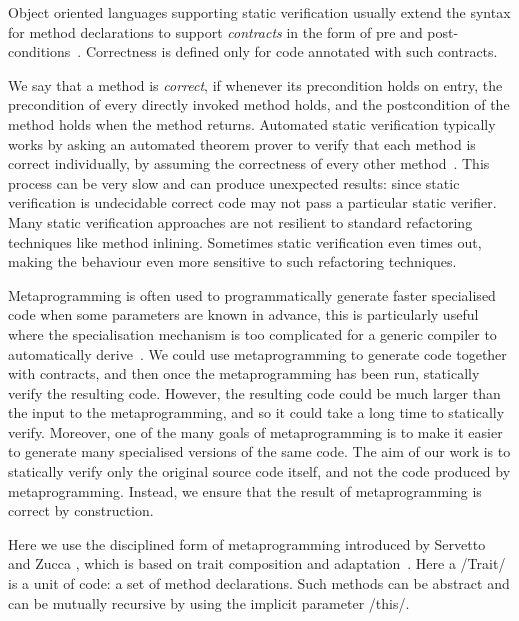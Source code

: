 \noindent Object oriented languages supporting static verification usually extend the syntax for method declarations
to support \emph{contracts} in the form of pre and post-conditions~\cite{Meyer:1988:OSC:534929}.
Correctness is defined only for code annotated with such contracts.

We say that a method is \emph{correct}, if whenever its precondition holds on entry, the precondition of every directly invoked method holds, and the postcondition of the method holds when the method returns. Automated static verification typically works by asking an automated theorem prover to verify that each method is correct individually, by assuming the correctness of every other method~\cite{barnett2004spec}. This process can be very slow and can produce unexpected results: since static verification is undecidable correct code may not pass a particular static verifier.
Many static verification approaches are not resilient to
standard refactoring techniques like 
method inlining. Sometimes static verification even times out, making the behaviour even more sensitive to such refactoring techniques.

Metaprogramming is often used to programmatically generate faster specialised code when some parameters are known in advance, this is particularly useful where the specialisation mechanism is too complicated for a generic compiler to automatically derive~\cite{Ofenbeck:2017:SGP:3136040.3136060}.
We could use metaprogramming to generate code together with contracts, and then once the metaprogramming has been run,
statically verify the resulting code. 
However, the resulting code could be much larger than the input to the metaprogramming, and so it could take a long time to statically verify.
Moreover, one of the many goals of metaprogramming is to make it easier to generate many specialised versions of the same  code.
The aim of our work is to statically verify only the original source code itself, and not the code produced by metaprogramming.
Instead, we
ensure that the result of metaprogramming is correct by construction.

Here we use the disciplined form of metaprogramming introduced by Servetto and Zucca \cite{servetto2014meta}, which is based on trait composition and adaptation~\cite{scharli2003traits}.
Here a /Trait/ is a unit of code: a set of method declarations.
Such methods can be abstract and can be
mutually recursive by using the implicit parameter /this/.

